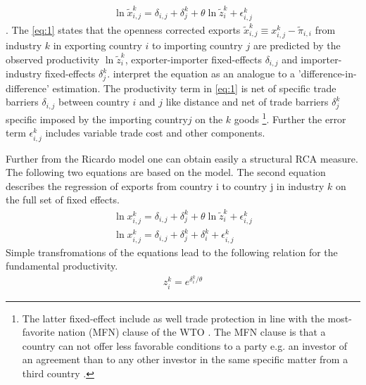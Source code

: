   \begin{align}
  \label{eq:1} \ln \tilde{x}_{i,j}^k=\delta_{i,j}+\delta_j^k + \theta \ln\tilde{z}_i^k
+\epsilon^k_{i,j}
 \end{align}  .
The \cref{eq:1} states that the openness corrected exports  $\tilde{x}_{i,j}^k \equiv x_{i,j}^k -  \tilde{\pi}_{i,i} $ from industry $k$ in exporting country $i$ to importing country $j$ are predicted by the observed productivity $\ln\tilde{z}_i^k$,  exporter-importer fixed-effects $\delta_{i,j}$ and importer-industry fixed-effects $\delta_j^k$. \textcite{costinot} interpret the equation as an analogue to a 'difference-in-difference' estimation.
The productivity term in \cref{eq:1} is net of specific trade barriers $\delta_{i,j}$ between country $i$ and $j$ like distance and net of trade barriers $\delta_j^k$ specific imposed by the importing country$j$ on the $k$ goods \footnote{The latter fixed-effect include as well  trade protection in line with the most-favorite nation (MFN) clause of the WTO \parencite{costinot}. The MFN clause is that a country can not offer less favorable conditions to a party e.g. an investor of an agreement than to any other investor in the same specific matter from a third country  \parencite{oecd-mfn}.}. Further the error term $\epsilon^k_{i,j}$ includes variable trade cost and other components. \par
Further from the Ricardo model one can obtain easily a structural RCA measure. The following two equations are based on the model. The second equation describes the regression of exports from country i to country j in industry $k$ on the full set of fixed effects.
   \begin{align} \label{eq:2}\ln {x}_{i,j}^k=\delta_{i,j}+\delta_j^k + \theta \ln\tilde{z}_i^k
+\epsilon^k_{i,j} \\
\ln {x}_{i,j}^k=\delta_{i,j}+\delta_j^k + \delta_i^k + \epsilon^k_{i,j}
 \end{align}
Simple transfromations of the equations lead to the following relation for the fundamental productivity.
 \begin{align*}
  z^k_i=e^{{\delta_i^ k}/{\theta}}
  \end{align*}
